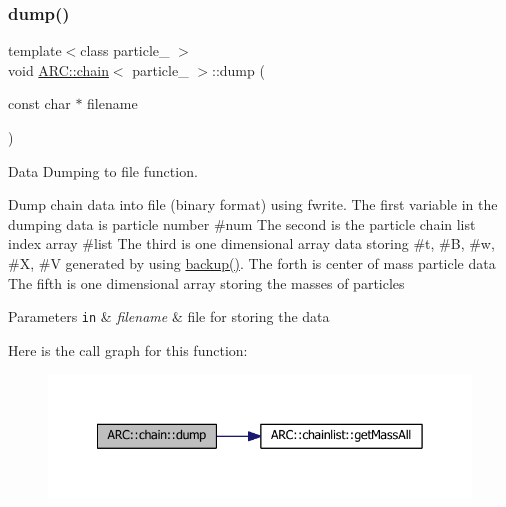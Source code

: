 \subsubsection{\texorpdfstring{dump()}{dump()}}
{\footnotesize\ttfamily template$<$class particle\+\_\+ $>$ \\
void \hyperlink{classARC_1_1chain}{A\+R\+C\+::chain}$<$ particle\+\_\+ $>$\+::dump (\begin{DoxyParamCaption}\item[{const char $\ast$}]{filename }\end{DoxyParamCaption})\hspace{0.3cm}{\ttfamily [inline]}}



Data Dumping to file function. 

Dump chain data into file (binary format) using fwrite. The first variable in the dumping data is particle number \#num The second is the particle chain list index array \#list The third is one dimensional array data storing \#t, \#B, \#w, \#X, \#V generated by using \hyperlink{classARC_1_1chain_a3ad5d3a5a2e899ec55bd4aafaa18c2d2}{backup()}. The forth is center of mass particle data The fifth is one dimensional array storing the masses of particles 
\begin{DoxyParams}[1]{Parameters}
\mbox{\tt in}  & {\em filename} & file for storing the data \\
\hline
\end{DoxyParams}
Here is the call graph for this function\+:
\nopagebreak
\begin{figure}[H]
\begin{center}
\leavevmode
\includegraphics[width=342pt]{classARC_1_1chain_a6caef2b2dc81cc944377a3ea511c0fe8_cgraph}
\end{center}
\end{figure}
\hypertarget{classARC_1_1chain_acd19e23d46d38d66c5eb60a2e9afe727}{}\label{classARC_1_1chain_acd19e23d46d38d66c5eb60a2e9afe727} 
